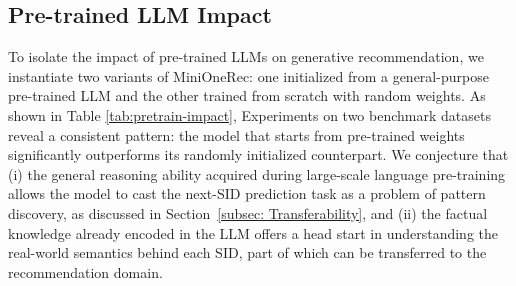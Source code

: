 \begin{table}[]
\caption{Performance of MiniOneRec initialized with pre-trained weights versus random initialization across two domains} 
\label{tab:pretrain-impact}
\end{table}


\subsection{Pre-trained LLM Impact}
\label{llmmatter}
To isolate the impact of pre-trained LLMs on generative recommendation, we instantiate two variants of MiniOneRec: one initialized from a general-purpose pre-trained LLM and the other trained from scratch with random weights. As shown in Table \ref{tab:pretrain-impact}, Experiments on two benchmark datasets reveal a consistent pattern: the model that starts from pre-trained weights significantly outperforms its randomly initialized counterpart. We conjecture that (i) the general reasoning ability acquired during large-scale language pre-training allows the model to cast the next-SID prediction task as a problem of pattern discovery, as discussed in Section~\ref{subsec: Transferability}, and (ii) the factual knowledge already encoded in the LLM offers a head start in understanding the real-world semantics behind each SID, part of which can be transferred to the recommendation domain.